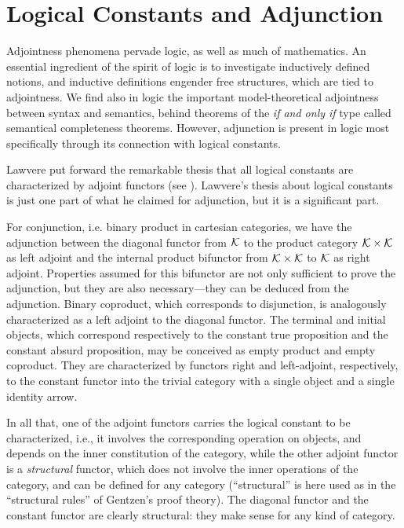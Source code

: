 \section{Logical Constants and Adjunction}

\noindent Adjointness phenomena pervade logic, as well as much of
mathematics. An essential ingredient of the spirit of logic is to
investigate inductively defined notions, and inductive definitions engender
free structures, which are tied to adjointness. We find also in logic the
important model-theoretical adjointness between syntax and semantics, behind
theorems of the {\it if and only if} type called semantical completeness
theorems. However, adjunction is present in logic most specifically through
its connection with logical constants.

Lawvere put forward the remarkable thesis that all logical constants are
characterized by adjoint functors (see \cite{Law69}). Lawvere's thesis about
logical constants is just one part of what he claimed for adjunction, but it
is a significant part.

For conjunction, i.e. binary product in cartesian categories, we have the
adjunction between the diagonal functor from ${\cal K}$ to the product
category ${\cal K}\times {\cal K}$ as left adjoint and the internal product
bifunctor from ${\cal K}\times {\cal K}$ to ${\cal K}$ as right adjoint.
Properties assumed for this bifunctor are not only sufficient to prove the
adjunction, but they are also necessary---they can be deduced from the
adjunction. Binary coproduct, which corresponds to disjunction, is
analogously characterized as a left adjoint to the diagonal functor. The
terminal and initial objects, which correspond respectively to the constant
true proposition and the constant absurd proposition, may be conceived as
empty product and empty coproduct. They are characterized by functors right
and left-adjoint, respectively, to the constant functor into the trivial
category with a single object and a single identity arrow.

In all that, one of the adjoint functors carries the logical constant to be
characterized, i.e., it involves the corresponding operation on objects, and
depends on the inner constitution of the category, while the other adjoint
functor is a {\it structural} functor, which does not involve the inner
operations of the category, and can be defined for any category
(``structural'' is here used as in the ``structural rules'' of Gentzen's
proof theory). The diagonal functor and the constant functor are clearly
structural: they make sense for any kind of category.

